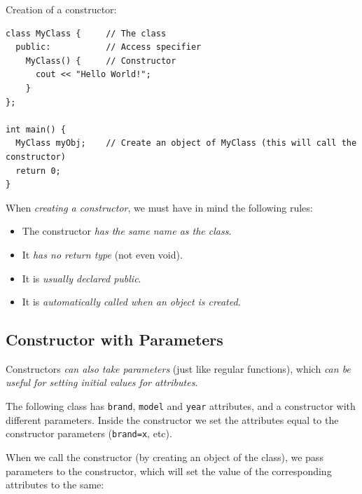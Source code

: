 \documentclass[../basic_programs.tex]{subfiles}
\begin{document}
    \begin{exa}
        Creation of a constructor:
        \begin{lstlisting}[caption={caption},label=DescriptiveLabel]
class MyClass {     // The class
  public:           // Access specifier
    MyClass() {     // Constructor
      cout << "Hello World!";
    }
};

int main() {
  MyClass myObj;    // Create an object of MyClass (this will call the constructor)
  return 0;
}

        \end{lstlisting}
    \end{exa}

    \begin{obs}
        When \textit{creating a constructor}, we must have in mind the following rules:
        \begin{itemize}
            \item The constructor \textit{has the same name as the class}.
            \item It \textit{has no return type} (not even void).
            \item It is \textit{usually declared public}.
            \item It is \textit{automatically called when an object is created}.
        \end{itemize}
    \end{obs}

    \subsection{Constructor with Parameters}

    \begin{mydef}
        Constructors \textit{can also take parameters} (just like regular functions), which \textit{can be useful for setting initial values for attributes}.
    \end{mydef}

    The following class has \lstinline|brand|, \lstinline|model| and \lstinline|year| attributes, and a constructor with different parameters. Inside the constructor we set the attributes equal to the constructor parameters (\lstinline|brand=x|, etc).

    When we call the constructor (by creating an object of the class), we pass parameters to the constructor, which will set the value of the corresponding attributes to the same:
\end{document}
